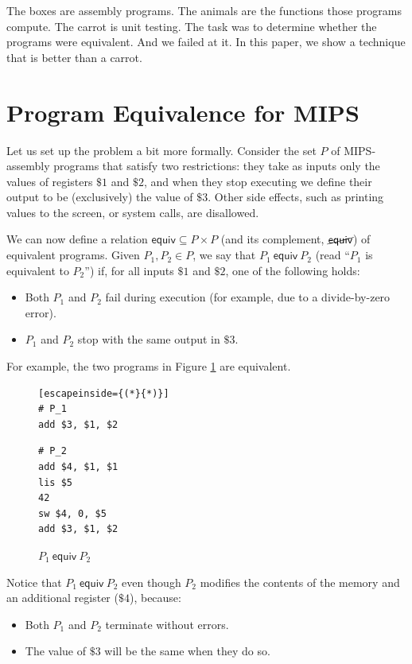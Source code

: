 \documentclass{llncs}
\newcommand{\erel}{\textsf{equiv}}
\newcommand{\pequiv}[2]{#1 \ \erel \ #2}
\begin{document}
The boxes are assembly programs. The animals are the functions those programs compute. The carrot is unit testing. The task was to determine whether the programs were equivalent. And we failed at it. In this paper, we show a technique that is better than a carrot.

\section{Program Equivalence for MIPS}
\label{progequiv}

Let us set up the problem a bit more formally. Consider the set $P$ of MIPS-assembly programs that satisfy two restrictions: they take as inputs only the values of registers $\$1$ and $\$2$, and when they stop executing we define their output to be (exclusively) the value of $\$3$. Other side effects, such as printing values to the screen, or system calls, are disallowed.

We can now define a relation $\erel \subseteq P \times P$ (and its complement, $\cancel{\erel}$) of equivalent programs. Given $P_1, P_2 \in P$, we say that $\pequiv{P_1}{P_2}$ (read ``$P_1$ is equivalent to $P_2$'') if, for all inputs $\$1$ and $\$2$, one of the following holds:
\begin{itemize}
\item Both $P_1$ and $P_2$ fail during execution (for example, due to a divide-by-zero error).
\item $P_1$ and $P_2$ stop with the same output in $\$3$. 
\end{itemize} 

For example, the two programs in Figure \ref{equivprogs} are equivalent.
 
\begin{figure}
\begin{multicols}{2}
\begin{lstlisting}[escapeinside={(*}{*)}]
# P_1
add $3, $1, $2
\end{lstlisting}
\vfill\null
\columnbreak
\begin{lstlisting}
# P_2
add $4, $1, $1
lis $5
42
sw $4, 0, $5
add $3, $1, $2
\end{lstlisting}
\end{multicols}
\caption{$\pequiv{P_1}{P_2}$}
\label{equivprogs}
\end{figure}

Notice that $\pequiv{P_1}{P_2}$ even though $P_2$ modifies the contents of the memory and an additional register ($\$4$), because:
\begin{itemize}
\item Both $P_1$ and $P_2$ terminate without errors.
\item The value of $\$3$ will be the same when they do so.
\end{itemize}
\end{document}
